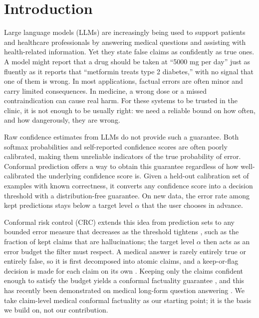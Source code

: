 
\section{Introduction}
\label{sec:intro}

Large language models (LLMs) are increasingly being used to support patients and
healthcare professionals by answering medical questions and assisting with
health-related information. Yet they state false claims as confidently as true
ones. A model might report that a drug should be taken at ``5000 mg per day'' just
as fluently as it reports that ``metformin treats type 2 diabetes,'' with no signal
that one of them is wrong. In most applications, factual errors are often minor and
carry limited consequences. In medicine, a wrong dose or a missed contraindication
can cause real harm. For these systems to be trusted in the clinic, it is not
enough to be usually right: we need a reliable bound on how often, and how
dangerously, they are wrong.

Raw confidence estimates from LLMs do not provide such a guarantee. Both softmax
probabilities and self-reported confidence scores are often poorly calibrated,
making them unreliable indicators of the true probability of error. Conformal
prediction offers a way to obtain this guarantee regardless of how well-calibrated
the underlying confidence score is. Given a held-out calibration set of examples
with known correctness, it converts any confidence score into a decision threshold
with a distribution-free guarantee. On new data, the error rate among kept
predictions stays below a target level $\alpha$ that the user chooses in advance.

Conformal risk control (CRC) extends this idea from prediction sets to any bounded
error measure that decreases as the threshold tightens \citep{angelopoulos2024crc},
such as the fraction of kept claims that are hallucinations; the target level
$\alpha$ then acts as an error budget the filter must respect. A medical answer is
rarely entirely true or entirely false, so it is first decomposed into atomic
claims, and a keep-or-flag decision is made for each claim on its own
\citep{min2023factscore}. Keeping only the claims confident enough to satisfy the
budget yields a conformal factuality guarantee \citep{mohri2024conformal}, and this
has recently been demonstrated on medical long-form question answering
\citep{cherian2024llm}. We take claim-level medical conformal factuality as our
starting point; it is the basis we build on, not our contribution.

